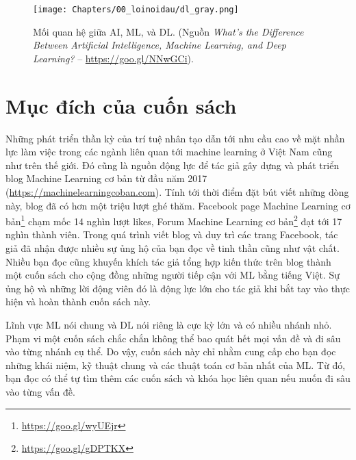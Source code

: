 \begin{figure}[]
\centering
    \texttt{[image: Chapters/00\_loinoidau/dl\_gray.png]}
    \caption[]{Mối quan hệ giữa AI, ML, và DL. (Nguồn \textit{What’s the Difference Between Artificial
    Intelligence, Machine Learning, and Deep Learning?} --
    \url{https://goo.gl/NNwGCi}).}
    \label{fig:0_1}
\end{figure}

\section{Mục đích của cuốn sách}
Những phát triển thần kỳ của trí tuệ nhân tạo dẫn tới nhu cầu cao về mặt nhần
lực làm việc trong các ngành liên quan tới machine learning ở Việt Nam cũng như
trên thế giới. Đó cũng là nguồn động lực để tác giả gây dựng và phát triển
blog Machine Learning cơ bản từ đầu năm 2017
(\url{https://machinelearningcoban.com}). Tính tới thời điểm đặt bút viết những
dòng này, blog đã có hơn một triệu lượt ghé thăm. Facebook page Machine Learning
cơ bản\footnote{\url{https://goo.gl/wyUEjr}} chạm mốc 14 nghìn lượt likes, Forum
Machine Learning cơ bản\footnote{\url{https://goo.gl/gDPTKX}} đạt tới 17 nghìn
thành viên. Trong quá trình viết blog và duy trì các trang Facebook, tác giả đã
nhận được nhiều sự ủng hộ của bạn đọc về tinh thần cũng như vật chất. Nhiều
bạn đọc cũng khuyến khích tác giả tổng hợp kiến thức trên blog thành một
cuốn sách cho cộng đồng những người tiếp cận với ML bằng tiếng
Việt. Sự ủng hộ và những lời động viên đó là động lực lớn cho tác giả khi bắt
tay vào thực hiện và hoàn thành cuốn sách này.


Lĩnh vực ML nói chung và DL nói riêng là cực kỳ lớn và có nhiều nhánh nhỏ. Phạm vi
một cuốn sách chắc chắn không thể bao quát hết mọi vấn đề và đi sâu vào từng
nhánh cụ thể. Do vậy, cuốn sách này chỉ nhằm cung cấp cho bạn đọc những
khái niệm, kỹ thuật chung và các thuật toán cơ bản nhất của ML. Từ đó, bạn đọc
có thể tự tìm thêm các cuốn sách và khóa học liên quan nếu muốn đi sâu vào từng
vấn đề.



